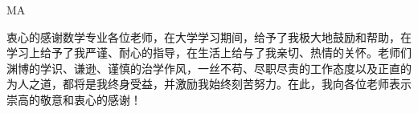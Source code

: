 
\begin{acknowledgment}{MA}

衷心的感谢数学专业各位老师，在大学学习期间，给予了我极大地鼓励和帮助，在学习上给予了我严谨、耐心的指导，在生活上给与了我亲切、热情的关怀。老师们渊博的学识、谦逊、谨慎的治学作风，一丝不苟、尽职尽责的工作态度以及正直的为人之道，都将是我终身受益，并激励我始终刻苦努力。在此，我向各位老师表示崇高的敬意和衷心的感谢！

\end{acknowledgment}


